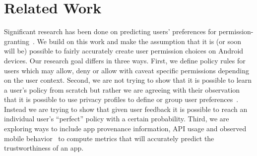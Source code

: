 \section{Related Work}
\label{RelatedWork}

Significant research has been done on predicting users' preferences
for
permission-granting~\cite{Benisch2011,Sadeh2009,lin2014soups,liu2014www}.
We build on this work and make the assumption that it is (or soon will
be) possible to fairly accurately create user permission choices on
Android devices. Our research goal differs in three ways. First, we
define policy rules for users which may allow, deny or allow with
caveat specific permissions depending on the user context. Second, we
are not trying to show that it is possible to learn a user's policy
from scratch but rather we are agreeing with their observation that it
is possible to use privacy profiles to define or group user
preferences~\cite{liu2014www}. Instead we are trying to show that
given user feedback it is possible to reach an individual user's
``perfect'' policy with a certain probability. Third, we are exploring
ways to include app provenance information, API usage and observed
mobile behavior~\cite{enck2010taintdroid} to compute metrics that will
accurately predict the trustworthiness of an app.

